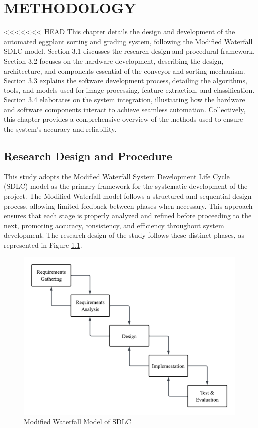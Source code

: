 
\chapter{METHODOLOGY}
{\baselineskip

<<<<<<< HEAD
This chapter details the design and development of the automated eggplant sorting and grading system, following the Modified Waterfall SDLC model. Section 3.1 discusses the research design and procedural framework. Section 3.2 focuses on the hardware development, describing the design, architecture, and components essential of the conveyor and sorting mechanism. Section 3.3 explains the software development process, detailing the algorithms, tools, and models used for image processing, feature extraction, and classification. Section 3.4 elaborates on the system integration, illustrating how the hardware and software components interact to achieve seamless automation. Collectively, this chapter provides a comprehensive overview of the methods used to ensure the system's accuracy and reliability.

\section{Research Design and Procedure}
This study adopts the Modified Waterfall System Development Life Cycle (SDLC) model as the primary framework for the systematic development of the project. The Modified Waterfall model follows a structured and sequential design process, allowing limited feedback between phases when necessary. This approach ensures that each stage is properly analyzed and refined before proceeding to the next, promoting accuracy, consistency, and efficiency throughout system development. The research design of the study follows these distinct phases, as represented in Figure \ref{fig:researchdesign}.

\begin{figure}
	\centering
	\includegraphics[width=0.7\linewidth]{figures/research_design}
	\caption{Modified Waterfall Model of SDLC}
	\label{fig:researchdesign}
\end{figure}

}

